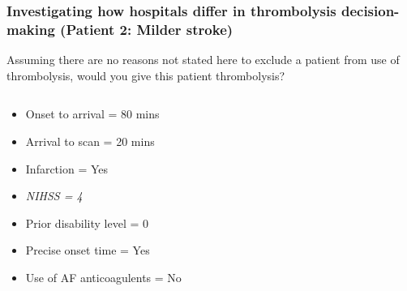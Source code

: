 \documentclass{beamer}
\begin{document}
\begin{frame}
\frametitle{Investigating how hospitals differ in thrombolysis decision-making (Patient 2: Milder stroke)}

Assuming there are no reasons not stated here to exclude a patient from use of thrombolysis, would you give this patient thrombolysis?

\vspace{3mm}

\begin{columns}
    \begin{column}{0.6\textwidth}
        \begin{itemize}
            \item Onset to arrival = 80 mins
            \item Arrival to scan = 20 mins
            \item Infarction = Yes
            \item \emph{NIHSS = 4}
            \item Prior disability level = 0
            \item Precise onset time = Yes
            \item Use of AF anticoagulents = No
        \end{itemize}
    \end{column}
    
    \begin{column}{0.4\textwidth}
    
    \end{column}

\end{columns}
\end{frame}
\end{document}
